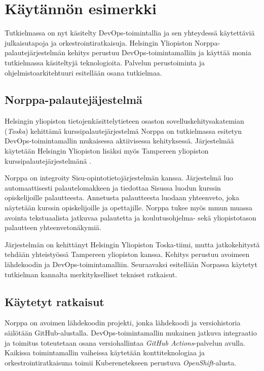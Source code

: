 \chapter{Käytännön esimerkki\label{example}}

Tutkielmassa on nyt käsitelty DevOps-toimintallia ja sen yhteydessä käytettäviä julkaisutapoja ja orkestrointiratkaisuja.
Helsingin Yliopiston Norppa-palautejärjestelmän kehitys perustuu DevOps-toimintamalliin ja käyttää monia tutkielmassa käsiteltyjä teknologioita.
Palvelun perustoiminta ja ohjelmistoarkitehtuuri esitellään osana tutkielmaa.


\section{Norppa-palautejäjestelmä}

Helsingin yliopiston tietojenkäsittelytieteen osaston sovelluskehitysakatemian (\textit{Toska}) \cite{Tenhunen23} kehittämä kurssipalautejärjestelmä Norppa on tutkielmassa esitetyn DevOps-toimintamallin mukaisessa aktiivisessa kehityksessä.
Järjestelmää käytetään Helsingin Yliopiston lisäksi myös Tampereen yliopiston kurssipalautejärjestelmänä \cite{Tampere23}.

Norppa on integroity Sisu-opintotietojärjestelmän kanssa. Järjestelmä luo automaattisesti palautelomakkeen ja tiedottaa Sisussa luodun kurssin opiskelijoille palautteesta.
Annetusta palautteesta luodaan yhteenveto, joka näytetään kurssin opiskelijoille ja opettajille.
Norppa tukee myös mmun muassa avointa tekstuaalista jatkuvaa palautetta ja koulutusohjelma- sekä yliopistotason palautteen yhteenvetonäkymiä.

Järjestelmän on kehittänyt Helsingin Yliopiston Toska-tiimi, mutta jatkokehitystä tehdään yhteistyössä Tampereen yliopiston kanssa.
Kehitys perustuu avoimeen lähdekoodin ja DevOps-toimintamalliin.
Seuraavaksi esitellään Norpassa käytetyt tutkielman kannalta merkitykselliset tekniset ratkaisut.

\section{Käytetyt ratkaisut}

Norppa on avoimen lähdekoodin projekti, jonka lähdekoodi ja versiohistoria säilötään GitHub-alustalla.
DevOps-toimintamallin mukainen jatkuva integraatio ja toimitus toteutetaan osana versiohallintaa \textit{GitHub Actions}-palvelun avulla.
Kaikissa toimintamallin vaiheissa käytetään konttiteknologiaa ja orkestrointiratkaisuna toimii Kuberenetekseen perustuva \textit{OpenShift}-alusta.


